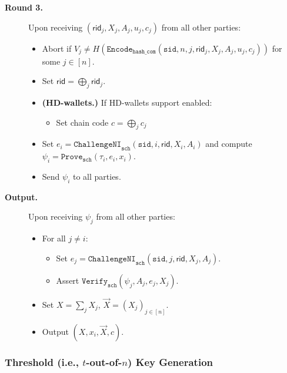 \documentclass[11pt]{article}
\newcommand{\sid}{\ensuremath{\mathtt{sid}}}
\newcommand{\challengeni}[1]{\ensuremath{\mathtt{ChallengeNI}_{\mathtt{#1}}}}
\newcommand{\prove}[1]{\ensuremath{\mathtt{Prove}_{\mathtt{#1}}}}
\newcommand{\verify}[1]{\ensuremath{\mathtt{Verify}_{\mathtt{#1}}}}
\newcommand{\Encode}[1]{\ensuremath{\mathtt{Encode}_{\mathtt{#1}}}}
\newcommand{\rid}{\textsf{rid}}
\newcommand{\?}[1]{\stackrel{?}{#1}}
\begin{document}
\begin{description}
\item[\bf Round 3.] 
    Upon receiving $(\rid_j, X_j, A_j, u_j, c_j)$ from all other parties:
    \begin{itemize}
    \item Abort if $V_j \neq H(\Encode{hash\_com}(\sid, n, j, \rid_j, X_j, A_j, u_j, c_j))$
          for some $j \in [n]$.
    \item Set $\rid = \bigoplus_j \rid_j$.
    \item {\bf (HD-wallets.)} If HD-wallets support enabled:
    \begin{itemize}
      \item Set chain code $c = \bigoplus_j c_j$
    \end{itemize}
    \item Set $e_i = \challengeni{sch}(\sid, i, \rid, X_i, A_i)$
          and compute $\psi_i = \prove{sch}(\tau_i, e_i, x_i)$.
    \item Send $\psi_i$ to all parties.
    \end{itemize}

\item[\bf Output.] 
    Upon receiving $\psi_j$ from all other parties:
    \begin{itemize}
    \item 
        For all $j \ne i$:
        \begin{itemize}
            \item Set $e_j = \challengeni{sch}(\sid, j, \rid, X_j, A_j)$.
            \item Assert $\verify{sch}(\psi_j, A_j, e_j, X_j)$.
        \end{itemize}

    \item Set $X = \sum_j X_j$,
              $\vec X = (X_j)_{j\in[n]}$.

    \item Output $(X, x_i, \vec X, c)$.
    \end{itemize}

\end{description}

\subsubsection{Threshold (i.e., $t$-out-of-$n$) Key Generation}
\label{sec:t-of-n-dkg}
\end{document}
